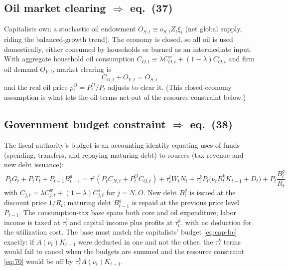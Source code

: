 \subsection{Oil market clearing \texorpdfstring{$\Rightarrow$}{=>} eq.\ (37)}
Capitalists own a stochastic oil endowment $O_{S,t}\equiv o_{S,t}Z_t\xi_t$ (net global supply, riding
the balanced-growth trend). The economy is closed, so all oil is used domestically, either consumed
by households or burned as an intermediate input. With aggregate household oil consumption
$C_{O,t}\equiv\lambda C^w_{O,t}+(1-\lambda)C^s_{O,t}$ and firm oil demand $O_{Y,t}$, market clearing is
\begin{equation}\label{eq:37}
\boxed{\,C_{O,t}+O_{Y,t}=O_{S,t}\,}\tag{P-37}
\end{equation}
and the real oil price $p^O_t=P^O_t/P_t$ adjusts to clear it. (This closed-economy assumption is what
lets the oil terms net out of the resource constraint below.)

\subsection{Government budget constraint \texorpdfstring{$\Rightarrow$}{=>} eq.\ (38)}
The fiscal authority's budget is an accounting identity equating uses of funds (spending, transfers,
and repaying maturing debt) to sources (tax revenue and new debt issuance):
\begin{equation}\label{eq:38}
\boxed{\,P_tG_t+P_tT_t+P_{t-1}B^g_{t-1}
=\tau^c(P_tC_{N,t}+P^O_tC_{O,t})+\tau^l_tW_tN_t+\tau^k_tP_t\big(\nu_tR^k_tK_{t-1}+D_t\big)+P_t\frac{B^g_t}{R_t}\,}\tag{P-38}
\end{equation}
with $C_{j,t}=\lambda C^w_{j,t}+(1-\lambda)C^s_{j,t}$ for $j=N,O$. New debt $B^g_t$ is issued at the
discount price $1/R_t$; maturing debt $B^g_{t-1}$ is repaid at the previous price level $P_{t-1}$. The
consumption-tax base spans both core and oil expenditure; labor income is taxed at $\tau^l_t$ and
capital income plus profits at $\tau^k_t$, with no deduction for the utilization cost. The base must
match the capitalists' budget \eqref{eq:cap-bc} exactly: if $A(\nu_t)K_{t-1}$ were deducted in one and
not the other, the $\tau^k_t$ terms would fail to cancel when the budgets are summed and the resource
constraint \eqref{eq:70} would be off by $\tau^k_tA(\nu_t)K_{t-1}$.

